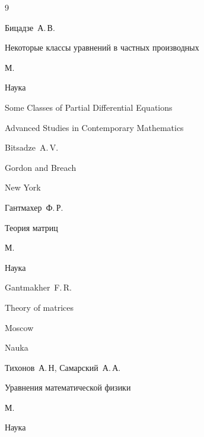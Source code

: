 \begin{thebibliography}{9}




\by Бицадзе~А.\,В.

\book Некоторые классы уравнений в частных производных

\publaddr М.

\publ Наука



\transl

\book Some Classes of Partial Differential Equations

\serial Advanced Studies in Contemporary Mathematics


\by  Bitsadze~A.\,V.

\publ Gordon and Breach

\publaddr New York








\by Гантмахер~Ф.\,Р.

\book Теория матриц

\publaddr М.

\publ Наука



\misctransl

\by Gantmakher~F.\,R.

\book Theory of matrices

\publaddr Moscow

\publ Nauka






\by Тихонов~А.\,Н, Самарский~А.\,А.

\book Уравнения математической физики

\publaddr М.

\publ Наука



\transl


\end{thebibliography}
